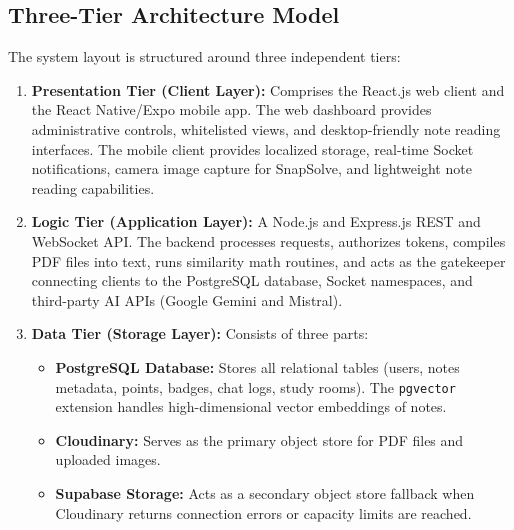 \documentclass[12,Times new Roman,a4paper]{report}
\begin{document}
\subsection{Three-Tier Architecture Model}
The system layout is structured around three independent tiers:
\begin{enumerate}
    \item \textbf{Presentation Tier (Client Layer):} Comprises the React.js web client and the React Native/Expo mobile app. The web dashboard provides administrative controls, whitelisted views, and desktop-friendly note reading interfaces. The mobile client provides localized storage, real-time Socket notifications, camera image capture for SnapSolve, and lightweight note reading capabilities.
    \item \textbf{Logic Tier (Application Layer):} A Node.js and Express.js REST and WebSocket API. The backend processes requests, authorizes tokens, compiles PDF files into text, runs similarity math routines, and acts as the gatekeeper connecting clients to the PostgreSQL database, Socket namespaces, and third-party AI APIs (Google Gemini and Mistral).
    \item \textbf{Data Tier (Storage Layer):} Consists of three parts:
    \begin{itemize}
        \item \textbf{PostgreSQL Database:} Stores all relational tables (users, notes metadata, points, badges, chat logs, study rooms). The \texttt{pgvector} extension handles high-dimensional vector embeddings of notes.
        \item \textbf{Cloudinary:} Serves as the primary object store for PDF files and uploaded images.
        \item \textbf{Supabase Storage:} Acts as a secondary object store fallback when Cloudinary returns connection errors or capacity limits are reached.
    \end{itemize}
\end{enumerate}
\end{document}
